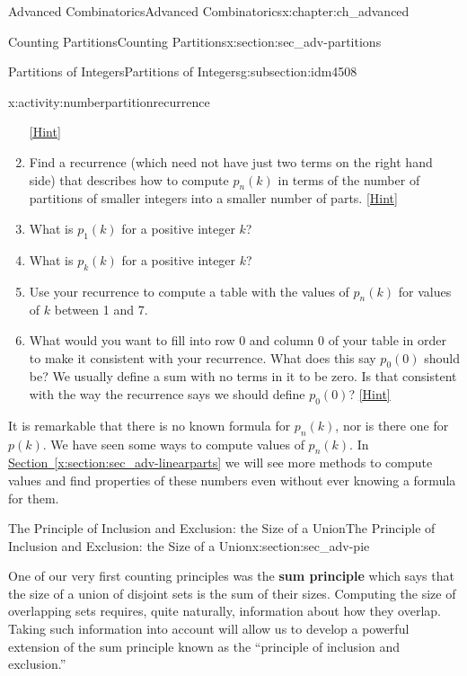 \documentclass[oneside,10pt,]{book}
\newcommand{\terminology}[1]{\textbf{#1}}
\numberwithin{equation}{chapter}
\begin{document}
\begin{chapterptx}{Advanced Combinatorics}{}{Advanced Combinatorics}{}{}{x:chapter:ch_advanced}
\begin{sectionptx}{Counting Partitions}{}{Counting Partitions}{}{}{x:section:sec_adv-partitions}
\begin{subsectionptx}{Partitions of Integers}{}{Partitions of Integers}{}{}{g:subsection:idm4508}
\begin{activity}{}{x:activity:numberpartitionrecurrence}
\begin{enumerate}[font=\bfseries,label=(\alph*),ref=\alph*]
\space\hspace*{0pt}\hfill{\tiny\hyperlink{g:hint:idm4755-back}{[Hint]}}\item{}Find a recurrence (which need not have just two terms on the right hand side) that describes how to compute \(p_n(k)\) in terms of the number of partitions of smaller integers into a smaller number of parts.%
\space\hspace*{0pt}\hfill{\tiny\hyperlink{g:hint:idm4787-back}{[Hint]}}\item{}What is \(p_1(k)\) for a positive integer \(k\)?%
\item{}What is \(p_k(k)\) for a positive integer \(k\)?%
\item{}Use your recurrence to compute a table with the values of \(p_n(k)\) for values of \(k\) between 1 and 7.%
\item{}What would you want to fill into row 0 and column 0 of your table in order to make it consistent with your recurrence.  What does this say \(p_0(0)\) should be?  We usually define a sum with no terms in it to be zero. Is that consistent with the way the recurrence says we should define \(p_0(0)\)?%
\space\hspace*{0pt}\hfill{\tiny\hyperlink{g:hint:idm4901-back}{[Hint]}}\end{enumerate}
\end{activity}
It is remarkable that there is no known formula for \(p_n(k)\), nor is there one for \(p(k)\). We have seen some ways to compute values of \(p_n(k)\).  In \hyperref[x:section:sec_adv-linearparts]{Section~\ref{x:section:sec_adv-linearparts}} we will see more methods to compute values and find properties of these numbers even without ever knowing a formula for them.%
\end{subsectionptx}
\end{sectionptx}
%
%
\typeout{************************************************}
\typeout{************************************************}
%
\begin{sectionptx}{The Principle of Inclusion and Exclusion: the Size of a Union}{}{The Principle of Inclusion and Exclusion: the Size of a Union}{}{}{x:section:sec_adv-pie}
\begin{introduction}{}%
One of our very first counting principles was the \terminology{sum principle} which says that the size of a union of disjoint sets is the sum of their sizes. Computing the size of overlapping sets requires, quite naturally, information about how they overlap. Taking such information into account will allow us to develop a powerful extension of the sum principle known as the ``principle of inclusion and exclusion.''%

\end{introduction}
\end{sectionptx}
\end{chapterptx}
\end{document}

